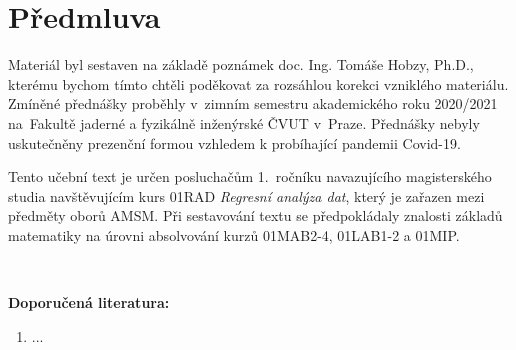 \chapter*{Předmluva}

Materiál byl sestaven na základě poznámek doc. Ing. Tomáše Hobzy, Ph.D., kterému bychom tímto chtěli poděkovat za rozsáhlou korekci vzniklého materiálu. Zmíněné přednášky proběhly v~zimním semestru akademického roku 2020/2021 na~Fakultě jaderné a
fyzikálně inženýrské ČVUT v~Praze. Přednášky nebyly uskutečněny prezenční formou vzhledem k probíhající pandemii Covid-19. 

Tento učební text je určen posluchačům 1.~ročníku navazujícího magisterského studia navštěvujícím kurs 01RAD\emph{	Regresní analýza dat}, který je zařazen
mezi předměty oborů AMSM. Při sestavování textu se předpokládaly znalosti základů matematiky na úrovni absolvování kurzů 01MAB2-4, 01LAB1-2 a 01MIP.

~

\textbf{Doporučená literatura:}
\begin{enumerate}[(1)]
  \item ...
\end{enumerate}
